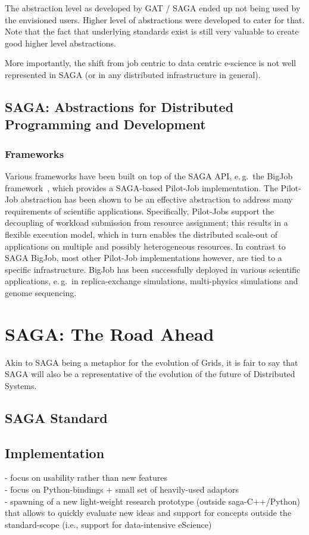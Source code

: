 \documentclass{article}
\begin{document}
The abstraction level as developed by GAT / SAGA ended up not being used by the envisioned users.
Higher level of abstractions were developed to cater for that. Note that the fact that underlying standards exist is still very valuable to create good higher level abstractions.

More importantly, the shift from job centric to data centric e-science is not well represented in SAGA (or in any distributed infrastructure in general).

\subsection{SAGA: Abstractions for Distributed Programming and
  Development}

\subsubsection{Frameworks}

Various frameworks have been built on top of the SAGA API, e.\,g.\ the BigJob
framework~\cite{saga_bigjob_condor_cloud}, which provides a SAGA-based
Pilot-Job implementation. The Pilot-Job abstraction has been shown to be an
effective abstraction to address many requirements of scientific applications.
Specifically, Pilot-Jobs support the decoupling of workload submission from
resource assignment; this results in a flexible execution model, which in turn
enables the distributed scale-out of applications on multiple and possibly
heterogeneous resources. In contrast to SAGA BigJob, most other Pilot-Job
implementations however, are tied to a specific infrastructure. BigJob has 
been successfully deployed in various scientific applications, e.\,g.\ in 
replica-exchange simulations, multi-physics simulations and genome sequencing.


\section{SAGA: The Road Ahead}

Akin to SAGA being a metaphor for the evolution of Grids, it is fair
to say that SAGA will also be a representative of the evolution of the
future of Distributed Systems.

\subsection{SAGA Standard}
\subsection{Implementation}
 - focus on usability rather than new features\\
 - focus on Python-bindings + small set of heavily-used adaptors\\
 - spawning of a new light-weight research prototype (outside saga-C++/Python) that allows to quickly evaluate new ideas and support for concepts outside the standard-scope (i.e., support for data-intensive eScience)\\
\end{document}
